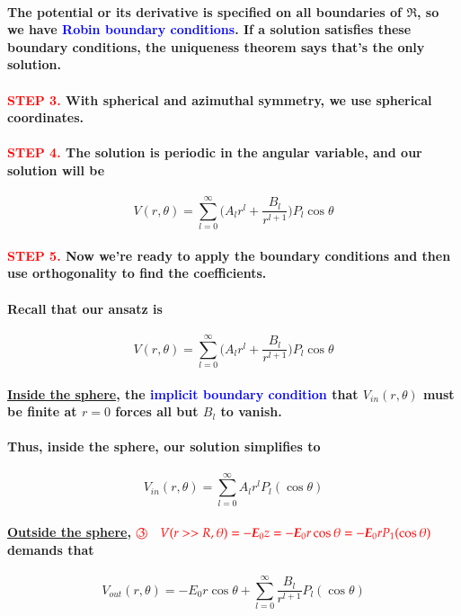 \documentclass{article}
\begin{document}
\paragraph{\indent The potential or its derivative is specified on all boundaries of $\mathfrak{R}$, so we have \textcolor{blue}{Robin boundary conditions}. If a solution satisfies these boundary conditions, the uniqueness theorem says that's the only solution.}
\paragraph{\textcolor{red}{STEP 3.} With spherical and azimuthal symmetry, we use spherical coordinates.}
\paragraph{\textcolor{red}{STEP 4.} The solution is periodic in the angular variable, and our solution will be}
\begin{equation*}
    V(r,\theta)=\sum_{l=0}^{\infty}\bigg(A_l r^l+\frac{B_l}{r^{l+1}}\bigg)P_l\cos\theta
\end{equation*}
\paragraph{\textcolor{red}{STEP 5.} Now we're ready to apply the boundary conditions and then use orthogonality to find the coefficients.}
\paragraph{Recall that our ansatz is }
\begin{equation*}
    V(r,\theta)=\sum_{l=0}^{\infty}\bigg(A_l r^l+\frac{B_l}{r^{l+1}}\bigg)P_l\cos\theta
\end{equation*}
\paragraph{\underline{Inside the sphere}, the \textcolor{blue}{implicit boundary condition} that $V_{in}(r,\theta)$ must be finite at $r=0$ forces all but $B_l$ to vanish.}
\paragraph{Thus, inside the sphere, our solution simplifies to}
\begin{equation*}
    V_{in}(r,\theta)=\sum_{l=0}^{\infty} A_l r^l P_l(\cos\theta)
\end{equation*}
\paragraph{\underline{Outside the sphere}, $\textcolor{red}{\text{\textcircled{3}}} \quad \textcolor{red}{V(r>>R,\theta)=-\boldsymbol{E}_0z=-\boldsymbol{E}_0 r\cos\theta=-\boldsymbol{E}_0 rP_1(\cos\theta)}$ demands that}
\begin{equation*}
    V_{out}(r,\theta)=-E_0 r \cos\theta + \sum_{l=0}^{\infty}\frac{B_l}{r^{l+1}}P_l(\cos\theta)
\end{equation*}
\end{document}
